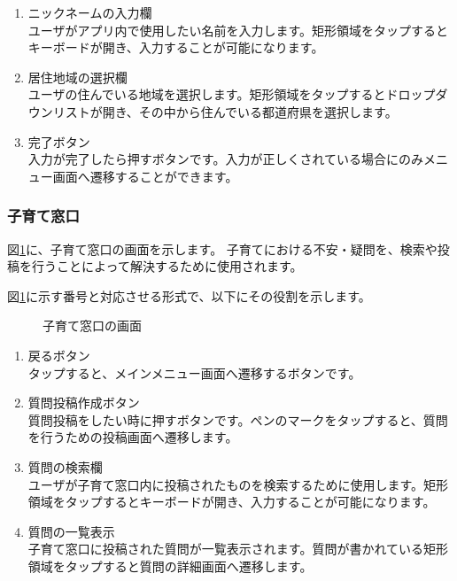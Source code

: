 \documentclass[a4j]{jarticle}
\begin{document}
\begin{enumerate}
  \renewcommand{\labelenumi}{\textcircled{\scriptsize \theenumi}}
  \item ニックネームの入力欄\\
        ユーザがアプリ内で使用したい名前を入力します。矩形領域をタップするとキーボードが開き、入力することが可能になります。
  \item 居住地域の選択欄\\
        ユーザの住んでいる地域を選択します。矩形領域をタップするとドロップダウンリストが開き、その中から住んでいる都道府県を選択します。
  \item 完了ボタン\\
        入力が完了したら押すボタンです。入力が正しくされている場合にのみメニュー画面へ遷移することができます。
\end{enumerate}

\subsubsection{子育て窓口}
図\ref{honjo_CR_Window}に、子育て窓口の画面を示します。
子育てにおける不安・疑問を、検索や投稿を行うことによって解決するために使用されます。

図\ref{honjo_CR_Window}に示す番号と対応させる形式で、以下にその役割を示します。

\begin{figure}[H]
    \begin{center}
    \caption {子育て窓口の画面}
    \label{honjo_CR_Window}
    \end{center}
\end{figure}

\begin{enumerate}
  \renewcommand{\labelenumi}{\textcircled{\scriptsize \theenumi}}
  \item 戻るボタン\\
        タップすると、メインメニュー画面へ遷移するボタンです。
  \item 質問投稿作成ボタン\\
        質問投稿をしたい時に押すボタンです。ペンのマークをタップすると、質問を行うための投稿画面へ遷移します。
  \item 質問の検索欄\\
        ユーザが子育て窓口内に投稿されたものを検索するために使用します。矩形領域をタップするとキーボードが開き、入力することが可能になります。
  \item 質問の一覧表示\\
        子育て窓口に投稿された質問が一覧表示されます。質問が書かれている矩形領域をタップすると質問の詳細画面へ遷移します。
\end{enumerate}
\end{document}
